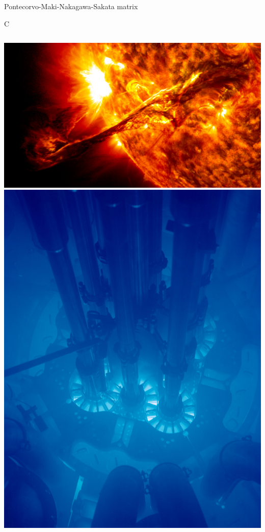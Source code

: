 \documentclass[]{beamer}
\begin{document}
\begin{frame}{Pontecorvo-Maki-Nakagawa-Sakata matrix}{}
\begin{IEEEeqnarray*}{C}
\begin{bmatrix}
		\end{bmatrix}
	\end{IEEEeqnarray*}
	\begin{columns}[c]
		\centering
		\includegraphics[width=\textwidth]{defence/sun}
		\centering
		\includegraphics[width=\textwidth]{defence/reactor}

\end{columns}
\end{frame}
\end{document}
